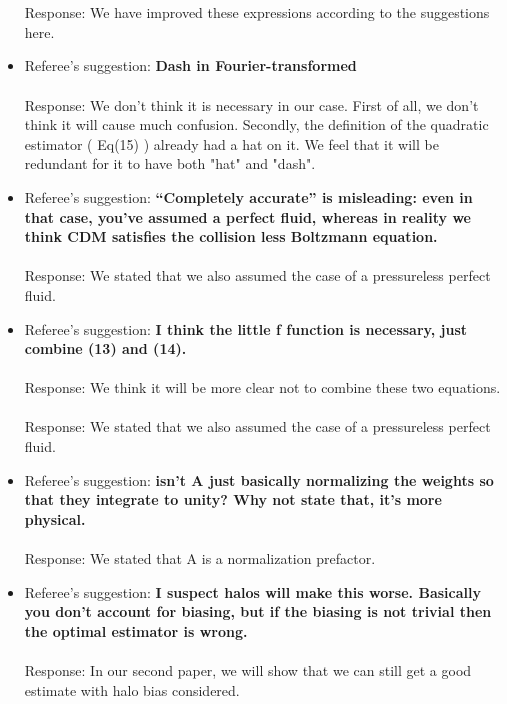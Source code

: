 \documentclass{article}
\begin{document}
\begin{itemize}
\\ \\Response: We have improved these expressions according to the suggestions here.
\item Referee's suggestion: \textbf{Dash in Fourier-transformed}
\\ \\Response: We don't think it is necessary in our case. First of all, we don't think it will cause much confusion. Secondly, the definition of the quadratic estimator ( Eq(15) ) already had a hat on it. We feel that it will be redundant for it to have both "hat" and "dash".
\item Referee's suggestion: \textbf{“Completely accurate” is misleading: even in that case, you’ve assumed a perfect fluid,
whereas in reality we think CDM satisfies the collision less Boltzmann equation.}
\\ \\Response: We stated that we also assumed the case of a pressureless perfect fluid.
\item Referee's suggestion: \textbf{I think the little f function is necessary, just combine (13) and (14).}
\\ \\Response: We think it will be more clear not to combine these two equations.
\\ \\Response: We stated that we also assumed the case of a pressureless perfect fluid.
\item Referee's suggestion: \textbf{isn’t A just basically normalizing the weights so that they integrate to unity?
Why not state that, it’s more physical.}
\\ \\Response: We stated that A is a normalization prefactor.
\item Referee's suggestion: \textbf{I suspect halos will make this worse. Basically you don’t account for biasing, but if the
biasing is not trivial then the optimal estimator is wrong.}
\\ \\Response: In our second paper, we will show that we can still get a good estimate with halo bias considered.
\\ \\


\end{itemize}
\end{document}
